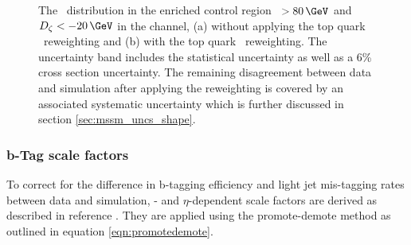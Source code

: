\begin{figure}[h!]
\begin{center}
\end{center}
\caption[The \mTtot~distribution in the \ttbar
enriched control region, with and without applying top quark \pT~reweighting.]{The \mTtot~distribution in the \ttbar enriched control region \MET~$>80\,\GeV$ and \mbox{$D_{\zeta}<-20\,\GeV$} in the \emu channel,
(a) without applying the top quark \pT~reweighting and (b) with the top quark \pT~reweighting.
The uncertainty band includes the statistical uncertainty as well as a 6\% \ttbar cross section uncertainty.
The remaining disagreement between data and simulation after applying the reweighting is covered by
an associated systematic uncertainty which is further discussed in section \ref{sec:mssm_uncs_shape}.}
\label{fig:mssm_corrs_toppt}
\end{figure}

\subsubsection*{b-Tag scale factors}
To correct for the difference in b-tagging efficiency
and light jet mis-tagging rates between data and simulation,
\pT- and $\eta$-dependent scale factors are derived as 
described in reference \cite{cms-btag-run2}. They 
are applied using the promote-demote method
as outlined in equation \ref{eqn:promotedemote}.
